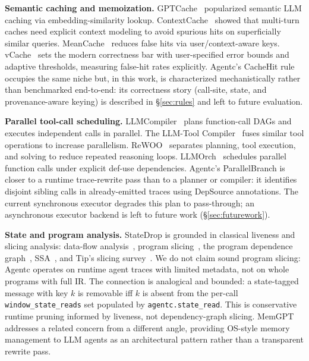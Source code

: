 \documentclass[sigconf,9pt]{acmart}
\begin{document}
\textbf{Semantic caching and memoization.} GPTCache~\cite{bang2023gptcache}
popularized semantic LLM caching via embedding-similarity lookup.
ContextCache~\cite{yan2025contextcache} showed that multi-turn caches need explicit
context modeling to avoid spurious hits on superficially similar queries.
MeanCache~\cite{gill2025meancache} reduces false hits via user/context-aware keys.
vCache~\cite{schroeder2026vcache} sets the modern correctness bar with user-specified
error bounds and adaptive thresholds, measuring false-hit rates explicitly. Agentc's
CacheHit rule occupies the same niche but, in this work, is characterized
mechanistically rather than benchmarked end-to-end: its correctness story
(call-site, state, and provenance-aware keying) is described in \S\ref{sec:rules}
and left to future evaluation.

\textbf{Parallel tool-call scheduling.} LLMCompiler~\cite{kim2024llmcompiler} plans
function-call DAGs and executes independent calls in parallel. The LLM-Tool
Compiler~\cite{singh2024llmtoolcompiler} fuses similar tool operations to increase
parallelism. ReWOO~\cite{xu2023rewoo} separates planning, tool execution, and solving
to reduce repeated reasoning loops. LLMOrch~\cite{liu2026llmorch} schedules parallel
function calls under explicit def-use dependencies. Agentc's ParallelBranch is closer
to a runtime trace-rewrite pass than to a planner or compiler: it identifies disjoint
sibling calls in already-emitted traces using DepSource annotations. The current
synchronous executor degrades this plan to pass-through; an asynchronous executor
backend is left to future work (\S\ref{sec:futurework}).

\textbf{State and program analysis.} StateDrop is grounded in classical liveness and
slicing analysis: data-flow analysis~\cite{allen1976dataflow}, program
slicing~\cite{weiser1981slicing}, the program dependence graph~\cite{ferrante1987pdg},
SSA~\cite{cytron1991ssa}, and Tip's slicing survey~\cite{tip1995survey}. We do not
claim sound program slicing: Agentc operates on runtime agent traces with limited
metadata, not on whole programs with full IR. The connection is analogical and
bounded: a state-tagged message with key $k$ is removable iff $k$ is absent from the
per-call \texttt{window\_state\_reads} set populated by \texttt{agentc.state\_read}.
This is conservative runtime pruning informed by liveness, not dependency-graph
slicing. MemGPT~\cite{packer2023memgpt} addresses a related concern from a different
angle, providing OS-style memory management to LLM agents as an architectural pattern
rather than a transparent rewrite pass.
\end{document}
